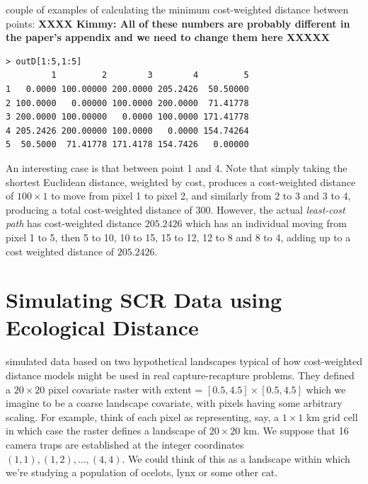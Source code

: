 couple of examples of calculating the minimum cost-weighted distance
between points: {\bf XXXX Kimmy: All of these numbers are probably
  different
in the paper's appendix and we need to change them here XXXXX}
\begin{center}
{\small
\begin{verbatim}
> outD[1:5,1:5]
         1         2        3        4         5
1   0.0000 100.00000 200.0000 205.2426  50.50000
2 100.0000   0.00000 100.0000 200.0000  71.41778
3 200.0000 100.00000   0.0000 100.0000 171.41778
4 205.2426 200.00000 100.0000   0.0000 154.74264
5  50.5000  71.41778 171.4178 154.7426   0.00000
\end{verbatim}
}
\end{center}
An interesting case is that between point 1 and 4. Note that simply
taking the shortest Euclidean distance, weighted by cost, produces a
cost-weighted distance of $100 \times 1$ to move from pixel 1 to pixel
2, and similarly from 2 to 3 and 3 to 4, producing a total
cost-weighted distance of $300$. However, the actual {\it least-cost
  path} has cost-weighted distance $205.2426$ which 
 has an individual moving from pixel 1 to 5, then 5
to 10, 10 to 15, 15 to 12, 12 to 8 and 8 to 4, adding up to a cost
weighted distance of 
$205.2426$.


\section{Simulating SCR Data using Ecological Distance}
\label{ecoldist.sec.simulating}

\citet{royle_etal:2012ecol} simulated data based on two hypothetical
landscapes typical of how
cost-weighted distance models might be used in real capture-recapture
problems.  They defined a $20 \times 20$ pixel covariate raster with
extent = $[0.5, 4.5] \times [0.5, 4.5]$ which we imagine to be a 
 coarse landscape covariate, with pixels
having some arbitrary scaling. For example, think of each pixel as
representing, say, a $1 \times 1$ km grid cell in which case 
the raster defines a landscape of $20 \times 20$ km. We suppose
that 16 camera traps are established at the integer coordinates
$(1,1), (1,2), \ldots, (4,4)$. We could think of this as a landscape
within which we're studying a population of ocelots, lynx or some
other cat.

